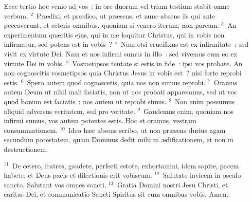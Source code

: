 \bchapter
\lettrine[lines=3,image=true,loversize=0.05,lraise=-0.03]{E}{}cce tertio hoc venio ad vos~: in ore duorum vel trium testium stabit omne verbum.
${}^{2}$~Pr\ae dixi, et pr\ae dico, ut pr\ae sens, et nunc absens iis qui ante peccaverunt, et ceteris omnibus, quoniam si venero iterum, non parcam.
${}^{3}$~An experimentum qu\ae ritis ejus, qui in me loquitur Christus, qui in vobis non infirmatur, sed potens est in vobis~?
${}^{4}$~Nam etsi crucifixus est ex infirmitate~: sed vivit ex virtute Dei. Nam et nos infirmi sumus in illo~: sed vivemus cum eo ex virtute Dei in vobis.
${}^{5}$~Vosmetipsos tentate si estis in fide~: ipsi vos probate. An non cognoscitis vosmetipsos quia Christus Jesus in vobis est~? nisi forte reprobi estis.
${}^{6}$~Spero autem quod cognoscetis, quia nos non sumus reprobi.
${}^{7}$~Oramus autem Deum ut nihil mali faciatis, non ut nos probati appareamus, sed ut vos quod bonum est faciatis~: nos autem ut reprobi simus.
${}^{8}$~Non enim possumus aliquid adversus veritatem, sed pro veritate.
${}^{9}$~Gaudemus enim, quoniam nos infirmi sumus, vos autem potentes estis. Hoc et oramus, vestram consummationem.
${}^{10}$~Ideo h\ae c absens scribo, ut non pr\ae sens durius agam secundum potestatem, quam Dominus dedit mihi in \ae dificationem, et non in destructionem.


${}^{11}$~De cetero, fratres, gaudete, perfecti estote, exhortamini, idem sapite, pacem habete, et Deus pacis et dilectionis erit vobiscum.
${}^{12}$~Salutate invicem in osculo sancto. Salutant vos omnes sancti.
${}^{13}$~Gratia Domini nostri Jesu Christi, et caritas Dei, et communicatio Sancti Spiritus sit cum omnibus vobis. Amen.
